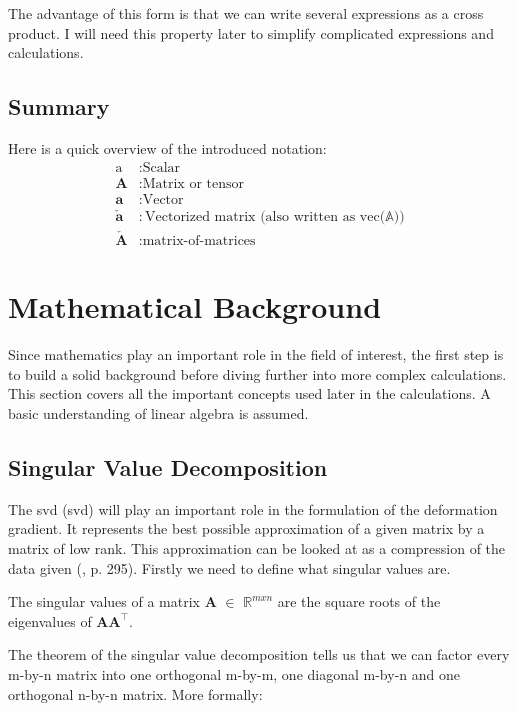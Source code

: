 The advantage of this form is that we can write several expressions as a cross product. I will need this property later to simplify complicated expressions and calculations.


\subsection{Summary}
Here is a quick overview of the introduced notation:
\begin{align*}
\text{a}&: \text{Scalar} \\
\mathbf{A}&: \text{Matrix or tensor} \\
\mathbf{a}&: \text{Vector} \\
\mathbf{\check{a}}&: \text{Vectorized matrix (also written as vec($\mathbb{A}$))} \\
\mathbf{\check{A}}&: \text{matrix-of-matrices}
\end{align*}


\section{Mathematical Background}
Since mathematics play an important role in the field of interest, the first step is to build a solid background before diving further into more complex calculations. This section covers all the important concepts used later in the calculations. A basic understanding of linear algebra is assumed.

\subsection{Singular Value Decomposition}

The \acrlong{svd} (\acrshort{svd}) will play an important role in the formulation of the deformation gradient. It represents the best possible approximation of a given matrix by a matrix of low rank. This approximation can be looked at as a compression of the data given (\cite{LiesenMehrmann2015}, p. 295). Firstly we need to define what singular values are.

\begin{definition}
\label{singular_values}
The singular values of a matrix $\mathbf{A}$ $\in$ $\mathbb{R}^{m x n}$ are the square roots of the eigenvalues of $\mathbf{AA}^{\intercal}$.
\end{definition}

The theorem of the singular value decomposition tells us that we can factor every m-by-n matrix into one orthogonal m-by-m, one diagonal m-by-n and one orthogonal n-by-n matrix. More formally:

